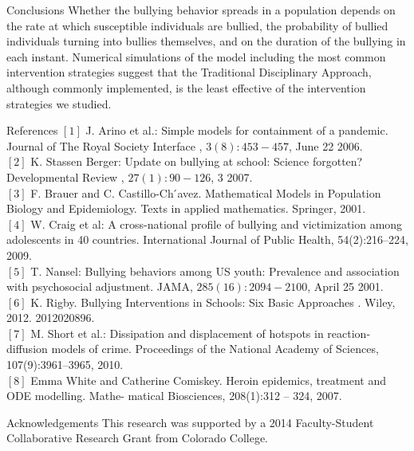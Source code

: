 \documentclass[serif,mathserif,final]{beamer}
\begin{document}
\begin{frame}{}
\begin{columns}[t]
\begin{column}{0.35\linewidth}
      \begin{block}{Conclusions} \small
Whether the bullying behavior spreads in a population depends on the rate at which susceptible individuals are bullied, the probability of bullied individuals turning into bullies themselves, and on the duration of the bullying in each instant. Numerical simulations of the model including the most common intervention strategies suggest that the Traditional Disciplinary Approach, although commonly implemented, is the least effective of the intervention strategies we studied.
      \end{block}

      \begin{block}{References} \tiny
        $[1]$ J. Arino et al.: Simple models for containment of a pandemic. Journal of The Royal Society Interface , $3(8):453-457$, June 22 2006.\\
 $[2]$ K. Stassen Berger: Update on bullying at school: Science forgotten? Developmental Review , $27(1): 90-126$, 3 2007.\\
 $[3]$ F. Brauer and C. Castillo-Ch ́avez. Mathematical Models in Population Biology and Epidemiology. Texts in applied mathematics. Springer, 2001.\\
 $[4]$ W. Craig et al: A cross-national profile of bullying and victimization among adolescents in 40 countries. International Journal of Public Health, 54(2):216–224, 2009.\\
 $[5]$ T. Nansel: Bullying behaviors among US youth: Prevalence and association with psychosocial adjustment. JAMA, $285(16):2094-2100$, April 25 2001.\\
 $[6]$ K. Rigby. Bullying Interventions in Schools: Six Basic Approaches . Wiley, 2012. 2012020896.\\
 $[7]$ M. Short et al.: Dissipation and displacement of hotspots in reaction-diffusion models of crime. Proceedings of the National Academy of Sciences, 107(9):3961–3965, 2010.\\
 $[8]$ Emma White and Catherine Comiskey. Heroin epidemics, treatment and ODE modelling. Mathe- matical Biosciences, 208(1):312 – 324, 2007.

      \end{block}
\begin{block}{Acknowledgements} \small
        This research was supported by a 2014 Faculty-Student Collaborative Research Grant from Colorado College.
      \end{block}
    \end{column}%

  \end{columns}
\end{frame}
\end{document}
